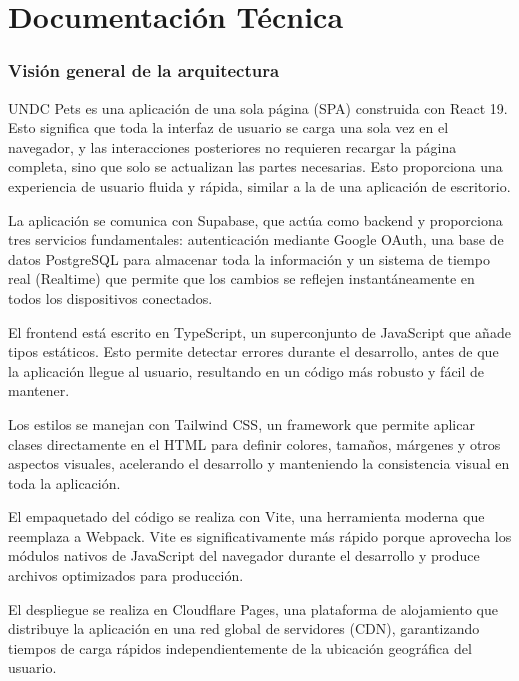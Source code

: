 \documentclass[12pt,a4paper]{article}
\begin{document}
\newpage
\part{Documentación Técnica}

\section{Visión general de la arquitectura}

UNDC Pets es una aplicación de una sola página (SPA) construida con React 19. Esto significa que toda la interfaz de usuario se carga una sola vez en el navegador, y las interacciones posteriores no requieren recargar la página completa, sino que solo se actualizan las partes necesarias. Esto proporciona una experiencia de usuario fluida y rápida, similar a la de una aplicación de escritorio.

La aplicación se comunica con Supabase, que actúa como backend y proporciona tres servicios fundamentales: autenticación mediante Google OAuth, una base de datos PostgreSQL para almacenar toda la información y un sistema de tiempo real (Realtime) que permite que los cambios se reflejen instantáneamente en todos los dispositivos conectados.

El frontend está escrito en TypeScript, un superconjunto de JavaScript que añade tipos estáticos. Esto permite detectar errores durante el desarrollo, antes de que la aplicación llegue al usuario, resultando en un código más robusto y fácil de mantener.

Los estilos se manejan con Tailwind CSS, un framework que permite aplicar clases directamente en el HTML para definir colores, tamaños, márgenes y otros aspectos visuales, acelerando el desarrollo y manteniendo la consistencia visual en toda la aplicación.

El empaquetado del código se realiza con Vite, una herramienta moderna que reemplaza a Webpack. Vite es significativamente más rápido porque aprovecha los módulos nativos de JavaScript del navegador durante el desarrollo y produce archivos optimizados para producción.

El despliegue se realiza en Cloudflare Pages, una plataforma de alojamiento que distribuye la aplicación en una red global de servidores (CDN), garantizando tiempos de carga rápidos independientemente de la ubicación geográfica del usuario.
\end{document}
